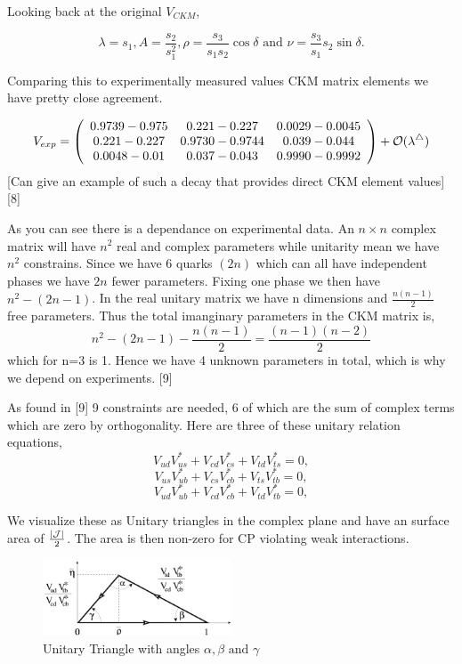 \documentclass[floatfix,aps,prd,amsmath,amssymb]{revtex4}
\begin{document}
Looking back at the original $V_{CKM}$,

\[\lambda =s_{1} , A=\frac{s_{2}}{s^{2}_{1}}, \rho =\frac{s_{3}}{s_{1}s_{2}}\cos\delta \mbox{ and } \nu = \frac{s_3}{s_1}{s_2}\sin\delta.\]

Comparing this to experimentally measured values CKM matrix elements we have pretty close agreement.

\[V_{exp} = \left( \begin{array}{ccc} 0.9739-0.975 & 0.221-0.227 & 0.0029-0.0045 \\ 0.221-0.227 & 0.9730-0.9744 & 0.039-0.044 \\ 0.0048-0.01 &  0.037-0.043 & 0.9990-0.9992 \end{array}\right) + \cal{O}(\lambda^4)\]
[Can give an example of such a decay that provides direct CKM element values][8]

 As you can see there is a dependance on experimental data. An $n\times n$ complex matrix will have $n^2$ real and complex parameters while unitarity mean we have $n^2$ constrains. Since we have 6 quarks $(2n)$ which can all have independent phases we have $2n$ fewer parameters. Fixing one phase we then have $n^2 - (2n - 1)$. In the real unitary matrix we have n dimensions and $\frac{n(n-1)}{2}$ free parameters. Thus the total imanginary parameters in the CKM matrix is,
 \[n^2 - (2n - 1)-\frac{n(n-1)}{2} = \frac{(n-1)(n-2)}{2}\]
 which for n=3 is 1. Hence we have 4 unknown parameters in total, which is why we depend on experiments. [9]

As found in [9] 9 constraints are needed, 6 of which are the sum of complex terms which are zero by orthogonality. Here are three of these unitary relation equations, 
\[V_{ud}V^{*}_{us}+V_{cd}V^{*}_{cs}+V_{td}V^{*}_{ts}=0,\]
\[V_{us}V^{*}_{ub}+V_{cs}V^{*}_{cb}+V_{ts}V^{*}_{tb}=0,\]
\[V_{ud}V^{*}_{ub}+V_{cd}V^{*}_{cb}+V_{td}V^{*}_{tb}=0,\]

We visualize these as Unitary triangles in the complex plane and have an surface area of $\frac{\left|\cal{J}\right|}{2}$. The area is then non-zero for CP violating weak interactions.

\begin{figure}[h]
\centering
\includegraphics[width=0.5\textwidth]{figs/ckmfig5.jpg}
\caption{Unitary Triangle with angles $\alpha, \beta \mbox{ and } \gamma$}
\label{tri4}
\end{figure}
\end{document}
